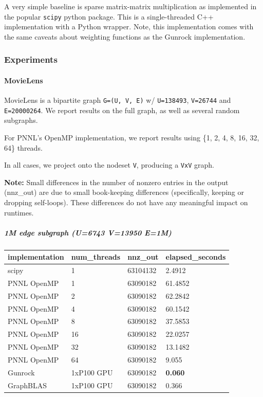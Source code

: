 \documentclass[10pt,oneside]{memoir}
\let\oldparagraph\paragraph
\renewcommand{\paragraph}[1]{\oldparagraph{#1}\mbox{}}
\let\oldsubparagraph\subparagraph
\renewcommand{\subparagraph}[1]{\oldsubparagraph{#1}\mbox{}}
\begin{document}
A very simple baseline is sparse matrix-matrix multiplication as
implemented in the popular \texttt{scipy} python package. This is a
single-threaded C++ implementation with a Python wrapper. Note, this
implementation comes with the same caveats about weighting functions as
the Gunrock implementation.

\hypertarget{experiments}{%
\subsubsection{Experiments}\label{experiments}}

\hypertarget{movielens}{%
\paragraph{MovieLens}\label{movielens}}

MovieLens is a bipartite graph \texttt{G=(U,\ V,\ E)} w/
\texttt{\textbar{}U\textbar{}=138493},
\texttt{\textbar{}V\textbar{}=26744} and
\texttt{\textbar{}E\textbar{}=20000264}. We report results on the full
graph, as well as several random subgraphs.

For PNNL's OpenMP implementation, we report results using \{1, 2, 4, 8,
16, 32, 64\} threads.

In all cases, we project onto the nodeset
\texttt{\textbar{}V\textbar{}}, producing a
\texttt{\textbar{}V\textbar{}x\textbar{}V\textbar{}} graph.

\textbf{Note:} Small differences in the number of nonzero entries in the
output (nnz\_out) are due to small book-keeping differences
(specifically, keeping or dropping self-loops). These differences do not
have any meaningful impact on runtimes.

\hypertarget{m-edge-subgraph-u6743-v13950-e1m}{%
\subparagraph{1M edge subgraph (\textbar{}U\textbar{}=6743
\textbar{}V\textbar{}=13950
\textbar{}E\textbar{}=1M)}\label{m-edge-subgraph-u6743-v13950-e1m}}

\begin{longtable}[]{@{}llll@{}}
\toprule
implementation & num\_threads & nnz\_out &
elapsed\_seconds\tabularnewline
\midrule
\endhead
scipy & 1 & 63104132 & 2.4912\tabularnewline
PNNL OpenMP & 1 & 63090182 & 61.4852\tabularnewline
PNNL OpenMP & 2 & 63090182 & 62.2842\tabularnewline
PNNL OpenMP & 4 & 63090182 & 60.1542\tabularnewline
PNNL OpenMP & 8 & 63090182 & 37.5853\tabularnewline
PNNL OpenMP & 16 & 63090182 & 22.0257\tabularnewline
PNNL OpenMP & 32 & 63090182 & 13.1482\tabularnewline
PNNL OpenMP & 64 & 63090182 & 9.055\tabularnewline
Gunrock & 1xP100 GPU & 63090182 & \textbf{0.060}\tabularnewline
GraphBLAS & 1xP100 GPU & 63090182 & 0.366\tabularnewline
\bottomrule
\end{longtable}
\end{document}
